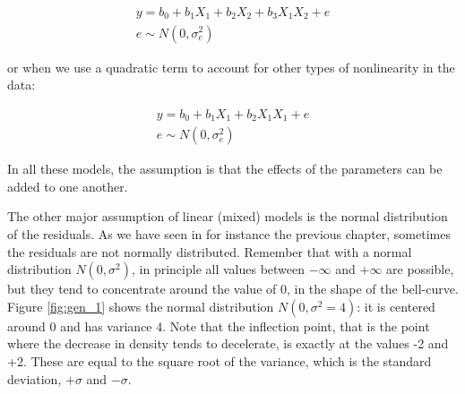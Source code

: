 \documentclass[]{report}\usepackage[]{graphicx}\usepackage[]{color}
\begin{document}
\begin{eqnarray}
y = b_0 + b_1 X_1 +  b_2 X_2 + b_3 X_1 X_2 + e \\
e \sim N(0, \sigma_e^2)
\end{eqnarray}


or when we use a quadratic term to account for other types of nonlinearity in the data:


\begin{eqnarray}
y = b_0 + b_1 X_1 +  b_2 X_1 X_1 + e \\
e \sim N(0, \sigma_e^2)
\end{eqnarray}

In all these models, the assumption is that the effects of the parameters can be added to one another.

The other major assumption of linear (mixed) models is the normal distribution of the residuals. As we have seen in for instance the previous chapter, sometimes the residuals are not normally distributed. Remember that with a normal distribution $N(0,\sigma^2)$, in principle all values between $-\infty$ and $+\infty$ are possible, but they tend to concentrate around the value of 0, in the shape of the bell-curve. Figure \ref{fig:gen_1} shows the normal distribution $N(0,\sigma^2=4)$: it is centered around 0 and has variance 4. Note that the inflection point, that is the point where the decrease in density tends to decelerate, is exactly at the values -2 and +2. These are equal to the square root of the variance, which is the standard deviation, $+\sigma$ and $-\sigma$.
\end{document}
